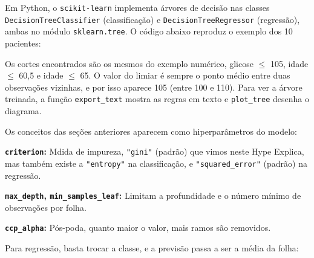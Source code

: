 {\subtitle{Colocando em prática com o scikit-learn}

\hspace*{1.5em}
Em Python, o \texttt{scikit-learn} implementa árvores de decisão nas classes
\texttt{DecisionTreeClassifier} (classificação) e \texttt{DecisionTreeRegressor} (regressão),
ambas no módulo \texttt{sklearn.tree}.
O código abaixo reproduz o exemplo dos 10 pacientes:


\hspace*{1.5em}
Os cortes encontrados são os mesmos do exemplo numérico, glicose $\leq$ 105, idade $\leq$ 60,5 e idade $\leq$ 65.
O valor do limiar é sempre o ponto médio entre duas observações vizinhas,
e por isso aparece 105 (entre 100 e 110).
Para ver a árvore treinada, a função \texttt{export\_text} mostra as regras em texto
e \texttt{plot\_tree} desenha o diagrama.

\subtitle{Controlando o tamanho da árvore}

\hspace*{1.5em}
Os conceitos das seções anteriores aparecem como hiperparâmetros do modelo:

\begin{hypeitemize}
    \item \textbf{\texttt{criterion}:} Mdida de impureza, \texttt{"gini"} (padrão) que vimos neste Hype Explica, mas também existe a \texttt{"entropy"} na classificação, e \texttt{"squared\_error"} (padrão) na regressão.
    \item \textbf{\texttt{max\_depth}, \texttt{min\_samples\_leaf}:} Limitam a profundidade e o número mínimo de observações por folha.
    \item \textbf{\texttt{ccp\_alpha}:} Pós-poda, quanto maior o valor, mais ramos são removidos.
\end{hypeitemize}

\hspace*{1.5em}
Para regressão, basta trocar a classe, e a previsão passa a ser a média da folha:


}
